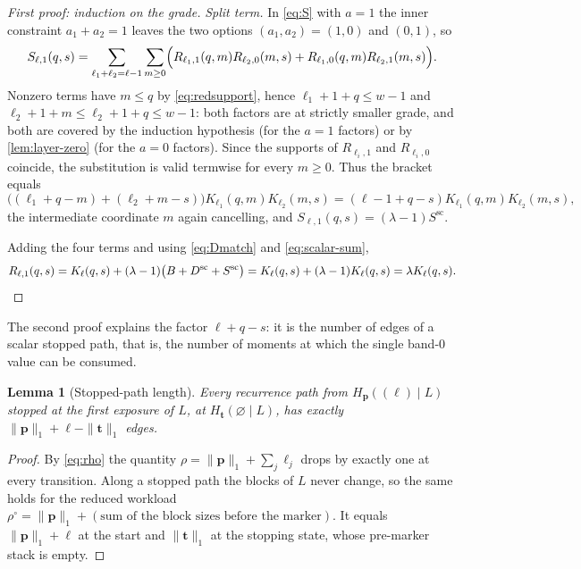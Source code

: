 \documentclass[11pt,reqno]{amsart}
\newtheorem{lemma}[theorem]{Lemma}
\theoremstyle{definition}
\theoremstyle{remark}
\begin{document}
\begin{proof}[First proof: induction on the grade]
\emph{Split term.}  In \eqref{eq:S} with $a=1$ the inner constraint
$a_1+a_2=1$ leaves the two options $(a_1,a_2)=(1,0)$ and $(0,1)$, so
\[
 S_{\ell,1}(q,s)=\sum_{\ell_1+\ell_2=\ell-1}\sum_{m\geq0}
 \Bigl(R_{\ell_1,1}(q,m)R_{\ell_2,0}(m,s)
 +R_{\ell_1,0}(q,m)R_{\ell_2,1}(m,s)\Bigr).
\]
Nonzero terms have $m\leq q$ by \eqref{eq:redsupport}, hence
$\ell_1+1+q\leq w-1$ and $\ell_2+1+m\leq \ell_2+1+q\leq w-1$: both factors
are at strictly smaller grade, and both are covered by the induction
hypothesis (for the $a=1$ factors) or by \cref{lem:layer-zero} (for the
$a=0$ factors).  Since the supports of $R_{\ell_i,1}$ and $R_{\ell_i,0}$
coincide, the substitution is valid termwise for every $m\geq0$.  Thus the
bracket equals
\[
 \bigl((\ell_1+q-m)+(\ell_2+m-s)\bigr)K_{\ell_1}(q,m)K_{\ell_2}(m,s)
 =(\ell-1+q-s)K_{\ell_1}(q,m)K_{\ell_2}(m,s),
\]
the intermediate coordinate $m$ again cancelling, and
$S_{\ell,1}(q,s)=(\lambda-1)S^{\mathrm{sc}}$.

Adding the four terms and using \eqref{eq:Dmatch} and
\eqref{eq:scalar-sum},
\[
 R_{\ell,1}(q,s)=K_\ell(q,s)+(\lambda-1)\bigl(B+D^{\mathrm{sc}}
 +S^{\mathrm{sc}}\bigr)
 =K_\ell(q,s)+(\lambda-1)K_\ell(q,s)=\lambda K_\ell(q,s).\qedhere
\]
\end{proof}

The second proof explains the factor $\ell+q-s$: it is the number of edges
of a scalar stopped path, that is, the number of moments at which the single
band-$0$ value can be consumed.

\begin{lemma}[Stopped-path length]\label{lem:path-length}
Every recurrence path from $H_{\mathbf p}((\ell)\mid L)$ stopped at the
first exposure of $L$, at $H_{\mathbf t}(\varnothing\mid L)$, has exactly
$\|\mathbf p\|_1+\ell-\|\mathbf t\|_1$ edges.
\end{lemma}

\begin{proof}
By \eqref{eq:rho} the quantity $\rho=\|\mathbf p\|_1+\sum_j\ell_j$ drops by
exactly one at every transition.  Along a stopped path the blocks of $L$
never change, so the same holds for the reduced workload
$\rho^\circ=\|\mathbf p\|_1+(\text{sum of the block sizes before the
marker})$.  It equals $\|\mathbf p\|_1+\ell$ at the start and
$\|\mathbf t\|_1$ at the stopping state, whose pre-marker stack is empty.
\end{proof}
\end{document}
